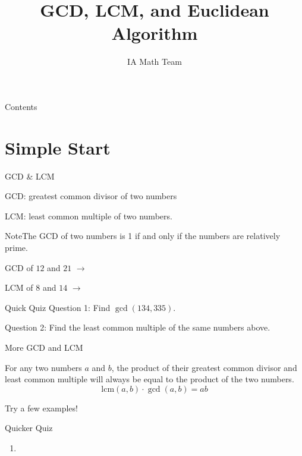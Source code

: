 \documentclass[aspectratio=169,xcolor=dvipsnames]{beamer}
\title[Number Theory]{GCD, LCM, and Euclidean Algorithm}
\author[IA Math Team]{IA Math Team}
\begin{document}
\begin{frame}[t]
  \titlepage
\end{frame}

\begin{frame}[t]{Contents}
  \tableofcontents
\end{frame}

\section{Simple Start}

\begin{frame}{GCD \& LCM}
    \begin{definition}
        GCD: greatest common divisor of two numbers
        
        LCM: least common multiple of two numbers.
    \end{definition}
    \begin{exampleblock}{Note}The GCD of two numbers is 1 if and only if the numbers are relatively prime.
    \end{exampleblock}

    \vspace{.5cm}
    GCD of $12$ and $21$ $\rightarrow$
    
    \break
    
    LCM of $8$ and $14$ $\rightarrow$
\end{frame}

\begin{frame}[t]{Quick Quiz}
    Question 1: Find $\gcd(134, 335)$.
    \vspace{3cm}
    
    Question 2: Find the least common multiple of the same numbers above.
\end{frame}
\begin{frame}[t]{More GCD and LCM}
    \begin{theorem}
        For any two numbers $a$ and $b$, the product of their greatest common divisor and least common multiple will always be equal to the product of the two numbers.
        $$\mathrm{lcm}(a, b)\cdot \gcd(a,b)=ab$$
    \end{theorem}
\vspace{2cm}
    Try a few examples!
\end{frame}

\begin{frame}[t]{Quicker Quiz}
    \begin{enumerate}
        \item 
    \end{enumerate}
\end{frame}
\end{document}

